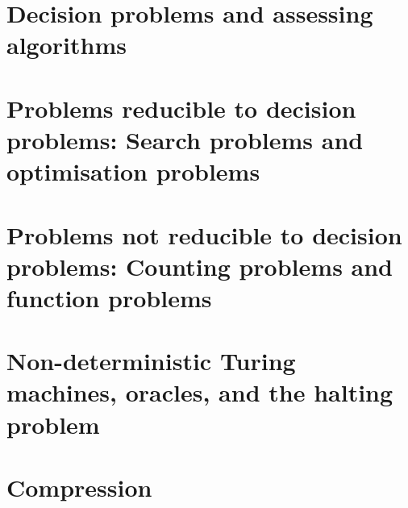\documentclass[oneside]{book}
\begin{document}
\part{Decision problems and assessing algorithms}








\part{Problems reducible to decision problems: Search problems and optimisation problems}



\part{Problems not reducible to decision problems: Counting problems and function problems}





\part{Non-deterministic Turing machines, oracles, and the halting problem}




\part{Compression}

\end{document}
